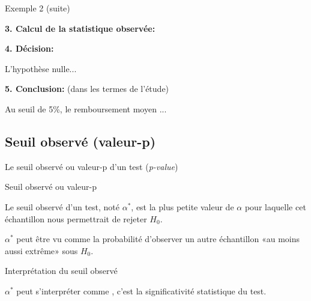 \documentclass{BeamerTemplate}
\begin{document}
\begin{frame}[t]{Exemple 2 (suite)}

{\bf 3. Calcul de la statistique observée:}

\vfill
{\bf 4. Décision:}

L'hypothèse nulle...

\bigskip
{\bf 5. Conclusion:} (dans les termes de l'étude)

Au seuil de 5\%, le remboursement moyen ...
\bigskip
\end{frame}

\subsection{Seuil observé (valeur-p)}

\begin{frame}[t]{Le seuil observé ou valeur-p d'un test ({\it p-value})}

\begin{Boite}{Seuil observé ou valeur-p}
{\small Le seuil observé d'un test,  noté $\alpha^*$,  est la \alert{plus petite valeur de $\alpha$} pour laquelle cet échantillon nous permettrait de rejeter  $H_0$.

 \vspace{3mm}

 $\alpha^*$ peut être vu comme la \alert{probabilité d'observer un autre échantillon  «au moins aussi extrême» sous $H_0$.}}
\end{Boite}


\end{frame}


\begin{frame}[t]{Interprétation du seuil observé}

 $\alpha^*$ peut s'interpréter comme , c'est la significativité statistique du test.

\vspace{3mm}

\vspace{3mm}

\end{frame}
\end{document}
